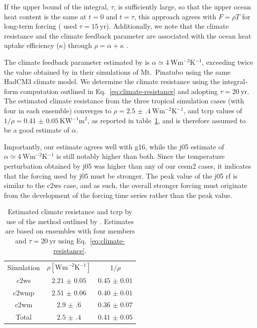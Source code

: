 \documentclass{ametsocV6.1}
\begin{document}
If the upper bound of the integral, \(\tau\), is sufficiently large, so that the upper
ocean heat content is the same at \(t=0\) and \(t=\tau\), this approach agrees with
\(F=\rho T\) for long-term forcing \citep{gregory2016} (\citet{merlis2014} used \(\tau
=\SI{15}{\mathrm{yr}}\)). Additionally, we note that the climate resistance and the
climate feedback parameter are associated with the ocean heat uptake efficiency
(\(\kappa\)) through \(\rho =\alpha +\kappa\) \citep{gregory2016}.

The climate feedback parameter estimated by \citet{jones2005} is \(\alpha \simeq
\SI{4}{\watt\metre^{-2}\kelvin^{-1}}\), exceeding twice the value obtained by
\citet{gregory2016} in their simulations of Mt.\ Pinatubo using the same HadCM3 climate
model. We determine the climate resistance using the integral-form computation outlined
in Eq.~\ref{eq:climate-resistance} and adopting \(\tau =\SI{20}{\mathrm{yr}}\). The
estimated climate resistance from the three tropical simulation cases (with four in each
ensemble) converges to \(\rho =\SI{2.5(4)}{\watt\metre^{-2}\kelvin^{-1}}\), and
\gls{tcrp} values of \(1/\rho=\SI{0.41(5)}{\kelvin\watt^{-1}\metre^{2}}\), as reported
in table~\ref{tab:trcp}, and is therefore assumed to be a good estimate of \(\alpha\).

Importantly, our estimate agrees well with \gls{g16}, while the \gls{j05} estimate of
\(\alpha \simeq \SI{4}{\watt\metre^{-2}\kelvin^{-1}}\) is still notably higher than
both. Since the temperature perturbation obtained by \gls{j05} was higher than any of
our \gls{cesm2} cases, it indicates that the forcing used by \gls{j05} must be stronger.
The peak value of the \gls{j05} \gls{rf} is similar to the \gls{c2ws} case, and as such,
the overall stronger forcing must originate from the development of the forcing time
series rather than the peak value.

\begin{table}
  \centering

  \caption{Estimated climate resistance and \gls{tcrp} by use of the method outlined by
    \citet{merlis2014}. Estimates are based on ensembles with four members and \(\tau
    =\SI{20}{\mathrm{yr}}\) using Eq.~\ref{eq:climate-resistance}.}\label{tab:trcp}%
  \begin{tabular}{ccc}
    Simulation  & \(\rho [\si{\watt\metre^{-2}\kelvin^{-1}}]\) & \(1/\rho\)        \\
    \gls{c2ws}  & \(\num{2.21(5)}\)                            & \(\num{0.45(1)}\) \\
    \gls{c2wmp} & \(\num{2.51(6)}\)                            & \(\num{0.40(1)}\) \\
    \gls{c2wm}  & \(\num{2.9(6)}\)                             & \(\num{0.36(7)}\) \\
    Total       & \(\num{2.5(4)}\)                             & \(\num{0.41(5)}\) \\
  \end{tabular}
\end{table}
\end{document}
